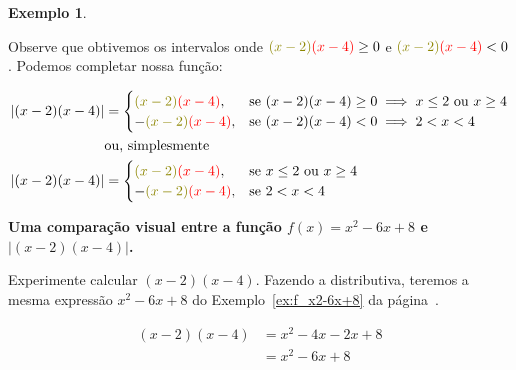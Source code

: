 \documentclass[12pt,openright,twoside,a4paper]{article}
\theoremstyle{definition}
\newtheorem{example}{Exemplo}[section]
\begin{document}
\begin{example}
\begin{center}
		\end{center}
		
		Observe que obtivemos os intervalos onde ${\textcolor{olive}{(x-2)}}{\textcolor{red}{(x-4)}} \geq 0$ e ${\textcolor{olive}{(x-2)}}{\textcolor{red}{(x-4)}} < 0$. Podemos completar nossa função:
		
		\begin{align*}
			|(x-2)(x-4)| &=
			\begin{cases}
				{\textcolor{olive}{(x-2)}}{\textcolor{red}{(x-4)}}, & \text{se } (x-2)(x-4) \geq 0 \implies x \leq 2 \text{ ou } x \geq 4\\
				- {\textcolor{olive}{(x-2)}}{\textcolor{red}{(x-4)}}, & \text{se }  (x-2)(x-4) < 0 \implies 2 < x < 4
			\end{cases}\\
			& \text{ou, simplesmente}\\
			|(x-2)(x-4)| &=
			\begin{cases}
				{\textcolor{olive}{(x-2)}}{\textcolor{red}{(x-4)}}, & \text{se } x \leq 2 \text{ ou } x \geq 4\\
				- {\textcolor{olive}{(x-2)}}{\textcolor{red}{(x-4)}}, & \text{se }   2 < x < 4
			\end{cases}
		\end{align*}
	\end{example}
	
	\textbf{Uma comparação visual entre a função $f(x) = x^2-6x+8$ e $|(x-2)(x-4)|$.}
	
	Experimente calcular $(x-2)(x-4)$. Fazendo a distributiva, teremos a mesma expressão $x^2-6x+8$ do Exemplo~\ref{ex:f_x2-6x+8} da página~\pageref{ex:f_x2-6x+8}.
	
	\begin{align*}
		(x-2)(x-4) &= x^2 - 4x - 2x + 8\\
		&=x^2 -6x + 8
	\end{align*}
	
\end{document}

